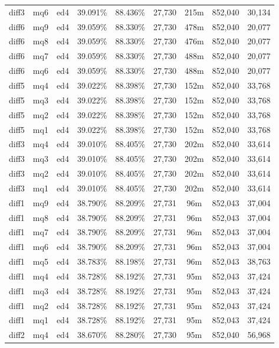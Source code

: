 \begin{landscape}
\begin{longtable}{|c|c|c||c|c||c|c|c|c|}
diff3 & mq6 & ed4 & 39.091\% & 88.436\% & 27,730 & 215m & 852,040 & 30,134 \\
diff6 & mq9 & ed4 & 39.059\% & 88.330\% & 27,730 & 478m & 852,040 & 20,077 \\
diff6 & mq8 & ed4 & 39.059\% & 88.330\% & 27,730 & 476m & 852,040 & 20,077 \\
diff6 & mq7 & ed4 & 39.059\% & 88.330\% & 27,730 & 488m & 852,040 & 20,077 \\
diff6 & mq6 & ed4 & 39.059\% & 88.330\% & 27,730 & 488m & 852,040 & 20,077 \\
diff5 & mq4 & ed4 & 39.022\% & 88.398\% & 27,730 & 152m & 852,040 & 33,768 \\
diff5 & mq3 & ed4 & 39.022\% & 88.398\% & 27,730 & 152m & 852,040 & 33,768 \\
diff5 & mq2 & ed4 & 39.022\% & 88.398\% & 27,730 & 152m & 852,040 & 33,768 \\
diff5 & mq1 & ed4 & 39.022\% & 88.398\% & 27,730 & 152m & 852,040 & 33,768 \\
diff3 & mq4 & ed4 & 39.010\% & 88.405\% & 27,730 & 202m & 852,040 & 33,614 \\
diff3 & mq3 & ed4 & 39.010\% & 88.405\% & 27,730 & 202m & 852,040 & 33,614 \\
diff3 & mq2 & ed4 & 39.010\% & 88.405\% & 27,730 & 202m & 852,040 & 33,614 \\
diff3 & mq1 & ed4 & 39.010\% & 88.405\% & 27,730 & 202m & 852,040 & 33,614 \\
diff1 & mq9 & ed4 & 38.790\% & 88.209\% & 27,731 & 96m & 852,043 & 37,004 \\
diff1 & mq8 & ed4 & 38.790\% & 88.209\% & 27,731 & 96m & 852,043 & 37,004 \\
diff1 & mq7 & ed4 & 38.790\% & 88.209\% & 27,731 & 96m & 852,043 & 37,004 \\
diff1 & mq6 & ed4 & 38.790\% & 88.209\% & 27,731 & 96m & 852,043 & 37,004 \\
diff1 & mq5 & ed4 & 38.783\% & 88.198\% & 27,731 & 96m & 852,043 & 38,763 \\
diff1 & mq4 & ed4 & 38.728\% & 88.192\% & 27,731 & 95m & 852,043 & 37,424 \\
diff1 & mq3 & ed4 & 38.728\% & 88.192\% & 27,731 & 95m & 852,043 & 37,424 \\
diff1 & mq2 & ed4 & 38.728\% & 88.192\% & 27,731 & 95m & 852,043 & 37,424 \\
diff1 & mq1 & ed4 & 38.728\% & 88.192\% & 27,731 & 95m & 852,043 & 37,424 \\
diff2 & mq4 & ed4 & 38.670\% & 88.280\% & 27,730 & 95m & 852,040 & 56,968 \\

\end{longtable}
\end{landscape}
